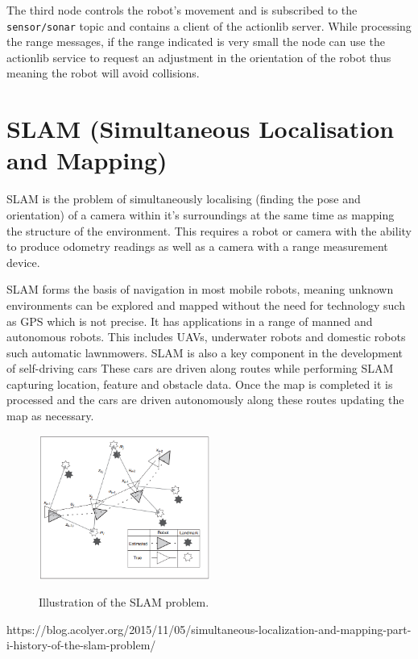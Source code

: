 \documentclass{mproj}
\begin{document}
The third node controls the robot's movement and is subscribed to the \texttt{sensor/sonar} topic and contains a client of the actionlib server. While processing the range messages, if the range indicated is very small the node can use the actionlib service to request an adjustment in the orientation of the robot thus meaning the robot will avoid collisions. 



\section{SLAM (Simultaneous Localisation and Mapping)}

SLAM is the problem of simultaneously localising (finding the pose and orientation) of a camera within it's surroundings at the same time as mapping the structure of the environment. This requires a robot or camera with the ability to produce odometry readings as well as a camera with a range measurement device.

SLAM forms the basis of navigation in most mobile robots, meaning unknown environments can be explored and mapped without the need for technology such as GPS which is not precise. It has applications in a range of manned and autonomous robots. This includes UAVs, underwater robots and domestic robots such automatic lawnmowers. SLAM is also a key component in the development of self-driving cars These cars are driven along routes while performing SLAM capturing location, feature and obstacle data. Once the map is completed it is processed and the cars are driven autonomously along these routes updating the map as necessary.


\begin{figure}[h]
  \caption{Illustration of the SLAM problem.}
  \centering
  \includegraphics[width=0.5\textwidth]{images/slam_problem.png}
  \label{fig:SLAM Problem}
\end{figure}
https://blog.acolyer.org/2015/11/05/simultaneous-localization-and-mapping-part-i-history-of-the-slam-problem/
\end{document}
